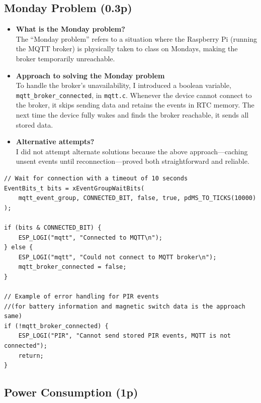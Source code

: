 \documentclass[A4,10pt]{article}
\begin{document}
\subsection{Monday Problem (0.3p)}

\begin{itemize}[noitemsep]
    \item \textbf{What is the Monday problem?}\\
    The “Monday problem” refers to a situation where the Raspberry Pi (running the MQTT broker) is physically taken to class on Mondays, making the broker temporarily unreachable.

    \item \textbf{Approach to solving the Monday problem}\\
    To handle the broker’s unavailability, I introduced a boolean variable, \texttt{mqtt\_broker\_connected}, in \texttt{mqtt.c}. Whenever the device cannot connect to the broker, it skips sending data and retains the events in RTC memory. The next time the device fully wakes and finds the broker reachable, it sends all stored data.

    \item \textbf{Alternative attempts?}\\
    I did not attempt alternate solutions because the above approach—caching unsent events until reconnection—proved both straightforward and reliable.
\end{itemize}

\begin{verbatim}
// Wait for connection with a timeout of 10 seconds
EventBits_t bits = xEventGroupWaitBits(
    mqtt_event_group, CONNECTED_BIT, false, true, pdMS_TO_TICKS(10000)
);

if (bits & CONNECTED_BIT) {
    ESP_LOGI("mqtt", "Connected to MQTT\n");
} else {
    ESP_LOGI("mqtt", "Could not connect to MQTT broker\n");
    mqtt_broker_connected = false;
}

// Example of error handling for PIR events 
//(for battery information and magnetic switch data is the approach same)
if (!mqtt_broker_connected) {
    ESP_LOGI("PIR", "Cannot send stored PIR events, MQTT is not connected");
    return;
}
\end{verbatim}

 
\subsection{Power Consumption (1p)}
\label{sec:power_consumption}
\end{document}
